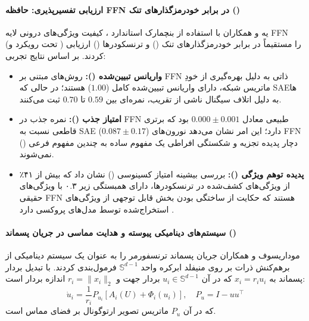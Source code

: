 \paragraph*{ارزیابی تفسیرپذیری: حافظه FFN در برابر خودرمزگذارهای تنک ()}
یه و همکاران \cite{ye2025transformer} با استفاده از بنچمارک استاندارد ، کیفیت ویژگی‌های درونی لایه FFN (تحت رویکرد  و ) را مستقیماً در برابر خودرمزگذارهای تنک () و ترنسکودرها () ارزیابی کردند. 
بر اساس نتایج تجربی:
\begin{itemize}
    \item \textbf{واریانس تبیین‌شده ():} روش‌های مبتنی بر FFN ذاتی به دلیل بهره‌گیری از خودِ ماتریس شبکه، دارای واریانس تبیین‌شده کامل ($1.00$) هستند؛ در حالی که SAEها به دلیل اتلاف سیگنال ناشی از تقریب، نمره‌ای بین $0.59$ تا $0.70$ ثبت می‌کنند.
    \item \textbf{امتیاز جذب ():} نمره جذب در FFN طبیعی معادل $0.000 \pm 0.001$ بود که برتری قاطعی نسبت به SAE ($0.087 \pm 0.17$) دارد؛ این امر نشان می‌دهد نورون‌های FFN دچار پدیده تجزیه و شکستگی افراطی یک مفهوم ساده به چندین مفهوم فرعی () نمی‌شوند.
    \item \textbf{پدیده توهم ویژگی ():} بررسی بیشینه امتیاز کسینوسی () نشان داد که بیش از ۴۱٪ از ویژگی‌های کشف‌شده در ترنسکودرها، دارای همبستگی زیر ۰.۳ با ویژگی‌های حقیقی FFN هستند که حکایت از ساختگی بودن بخش قابل توجهی از ویژگی‌های استخراج‌شده توسط مدل‌های پروکسی دارد \cite{ye2025transformer}.
\end{itemize}

\paragraph*{سیستم‌های دینامیکی پیوسته و هدایت مماسی در جریان پسماند ()}
موداریسوف و همکاران \cite{mudarisov2026feedforward} جریان پسماند ترنسفورمر را به عنوان یک سیستم دینامیکی از برهم‌کنش ذرات بر روی منیفلد ابرکره واحد $\mathbb{S}^{d-1}$ فرمول‌بندی کردند. با تبدیل بردار پسماند به $x_i = r_i u_i$ که در آن $u_i \in \mathbb{S}^{d-1}$ بردار جهت و $r_i = \|x_i\|_2$ اندازه بردار است:
\begin{equation}
    \dot{u}_i = \frac{1}{r_i} P_{u_i} \left[ A_i(U) + \Phi_i(u_i) \right], \quad P_u = I - u u^\top
\end{equation}
که در آن $P_u$ ماتریس تصویر ارتوگونال بر فضای مماس است. 

